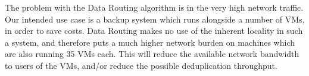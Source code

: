 The problem with the Data Routing algorithm is in the very high network traffic.
Our intended use case is a backup system which runs alongside a number of VMs,
in order to save costs. Data Routing makes no use of the inherent locality in
such a system, and therefore puts a much higher network burden on machines which
are also running 35 VMs each. This will reduce the available network bandwidth
to users of the VMs, and/or reduce the possible deduplication throughput.

